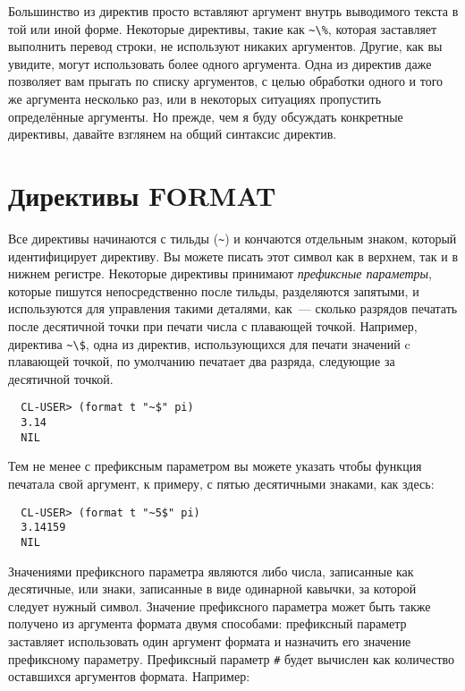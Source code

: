 Большинство из директив  просто вставляют аргумент внутрь выводимого текста в
той или иной форме. Некоторые директивы, такие как \lstinline!~\%!, которая заставляет
 выполнить перевод строки, не используют никаких аргументов. Другие, как вы
увидите, могут использовать более одного аргумента. Одна из директив даже позволяет вам
прыгать по списку аргументов, с целью обработки одного и того же аргумента несколько раз,
или в некоторых ситуациях пропустить определённые аргументы. Но прежде, чем я буду
обсуждать конкретные директивы, давайте взглянем на общий синтаксис директив.

\section{Директивы FORMAT}

Все директивы начинаются с тильды (\lstinline!~!) и кончаются отдельным знаком, который
идентифицирует директиву. Вы можете писать этот символ как в верхнем, так и в нижнем
регистре. Некоторые директивы принимают \textit{префиксные параметры}, которые пишутся
непосредственно после тильды, разделяются запятыми, и используются для управления такими
деталями, как~--- сколько разрядов печатать после десятичной точки при печати числа с
плавающей точкой. Например, директива \lstinline!~\$!, одна из директив, использующихся
для печати значений c плавающей точкой, по умолчанию печатает два разряда, следующие за
десятичной точкой.

\begin{verbatim}
  CL-USER> (format t "~$" pi)
  3.14
  NIL
\end{verbatim}

Тем не менее с префиксным параметром вы можете указать чтобы функция печатала свой
аргумент, к примеру, с пятью десятичными знаками, как здесь:

\begin{verbatim}
  CL-USER> (format t "~5$" pi)
  3.14159
  NIL
\end{verbatim}

Значениями префиксного параметра являются либо числа, записанные как десятичные, или
знаки, записанные в виде одинарной кавычки, за которой следует нужный символ. Значение
префиксного параметра может быть также получено из аргумента формата двумя способами:
префиксный параметр  заставляет  использовать один аргумент формата и
назначить его значение префиксному параметру. Префиксный параметр \lstinline!#! будет вычислен
как количество оставшихся аргументов формата. Например:

